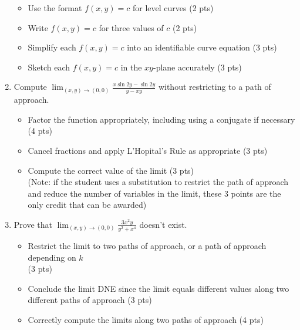 \documentclass[12pt]{article}
\newcommand{\liner}{\noindent\underline{\hspace*{7in}}}
\newcommand{\ds}{\displaystyle}
\begin{document}
\begin{enumerate}
  \begin{itemize}
    \item Use the format $f(x,y)=c$ for level curves (2 pts)
    \item Write $f(x,y)=c$ for three values of $c$ (2 pts)
    \item Simplify each $f(x,y)=c$ into an identifiable curve equation (3 pts)
    \item Sketch each $f(x,y)=c$ in the $xy$-plane accurately (3 pts)
  \end{itemize}

\vspace*{7.6in}

\liner

\newpage


\item Compute $\ds \lim_{(x,y)\to(0,0)} \frac{x\sin 2y - \sin 2y}{y-xy}$ without restricting to a path of approach.

  \begin{itemize}
    \item Factor the function appropriately, including using a conjugate if necessary (4 pts)
    \item Cancel fractions and apply L'Hopital's Rule as appropriate (3 pts)
    \item Compute the correct value of the limit (3 pts) \\ (Note: if the student uses a substitution to restrict the path of approach and reduce the number of variables in the limit, these 3 points are the only credit that can be awarded)
  \end{itemize}

\vspace*{7in}

\liner

\newpage


\item Prove that $\ds \lim_{(x,y)\to(0,0)} \frac{3x^2y}{y^2+x^4}$ doesn't exist.

  \begin{itemize}
    \item Restrict the limit to two paths of approach, or a path of approach depending on $k$ \\ (3 pts)
    \item Conclude the limit DNE since the limit equals different values along two different paths of approach (3 pts)
    \item Correctly compute the limits along two paths of approach (4 pts)
  \end{itemize}


\end{enumerate}
\end{document}
